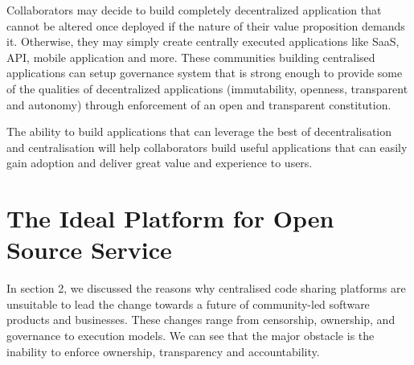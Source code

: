 Collaborators may decide to build completely decentralized application that cannot be altered once deployed if the nature of their value proposition demands it. Otherwise, they may simply create centrally executed applications like SaaS, API, mobile application and more. These communities building centralised applications can setup governance system that is strong enough to provide some of the qualities of decentralized applications (immutability, openness, transparent and autonomy) through enforcement of an open and transparent constitution.

The ability to build applications that can leverage the best of decentralisation and centralisation will help collaborators build useful applications that can easily gain adoption and deliver great value and experience to users.


\section{The Ideal Platform for Open Source Service}

In section 2, we discussed the reasons why centralised code sharing platforms are unsuitable to lead the change towards a future of community-led software products and businesses. These changes range from censorship, ownership, and governance to execution models. We can see that the major obstacle is the inability to enforce ownership, transparency and accountability.\\


